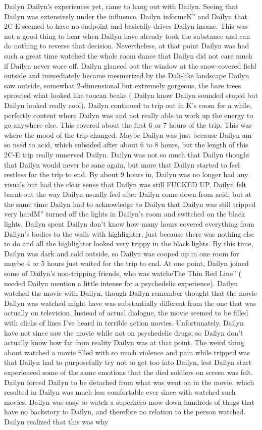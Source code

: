 \documentclass[12pt]{book}
\begin{document}
Dailyn Dailyn's experiences yet, came to hang out with Dailyn. Seeing that Dailyn was extensively under the influence, Dailyn informeK'' and Dailyn that 2C-E seemed to have no endpoint and basically drives Dailyn insane. This was not a good thing to hear when Dailyn have already took the substance and can do nothing to reverse that decision. Nevertheless, at that point Dailyn was had such a great time watched the whole room dance that Dailyn did not care much if Dailyn never wore off. Dailyn glanced out the window at the snow-covered field outside and immediately became mesmerized by the Dali-like landscape Dailyn saw outside, somewhat 2-dimensional but extremely gorgeous, the bare trees sprouted what looked like toucan beaks ( Dailyn know Dailyn sounded stupid but Dailyn looked really cool). Dailyn continued to trip out in K's room for a while, perfectly content where Dailyn was and not really able to work up the energy to go anywhere else. This covered about the first 6 or 7 hours of the trip. This was where the mood of the trip changed. Maybe Dailyn was just because Dailyn am so used to acid, which subsided after about 6 to 8 hours, but the length of this 2C-E trip really unnerved Dailyn. Dailyn was not so much that Dailyn thought that Dailyn would never be sane again, but more that Dailyn started to feel restless for the trip to end. By about 9 hours in, Dailyn was no longer had any visuals but had the clear sense that Dailyn was still FUCKED UP. Dailyn felt burnt-out the way Dailyn usually feel after Dailyn come down from acid, but at the same time Dailyn had to acknowledge to Dailyn that Dailyn was still tripped very hardM'' turned off the lights in Dailyn's room and switched on the black lights. Dailyn spent Dailyn don't know how many hours covered everything from Dailyn's bodies to the walls with highlighter, just because there was nothing else to do and all the highlighter looked very trippy in the black lights. By this time, Dailyn was dark and cold outside, so Dailyn was cooped up in one room for maybe 4 or 5 hours just waited for the trip to end. At one point, Dailyn joined some of Dailyn's non-tripping friends, who was watcheThe Thin Red Line'' ( needed Dailyn mention a little intense for a psychedelic experience). Dailyn watched the movie with Dailyn, though Dailyn remember thought that the movie Dailyn was watched might have was substantially different from the one that was actually on television. Instead of actual dialogue, the movie seemed to be filled with clichs of lines I've heard in terrible action movies. Unfortunately, Dailyn have not since saw the movie while not on psychedelic drugs, so Dailyn don't actually know how far from reality Dailyn was at that point. The weird thing about watched a movie filled with so much violence and pain while tripped was that Dailyn had to purposefully try not to get too into Dailyn, lest Dailyn start experienced some of the same emotions that the died soldiers on screen was felt. Dailyn forced Dailyn to be detached from what was went on in the movie, which resulted in Dailyn was much less comfortable ever since with watched such movies. Dailyn was easy to watch a superhero mow down hundreds of thugs that have no backstory to Dailyn, and therefore no relation to the person watched. Dailyn realized that this was why 
\end{document}
